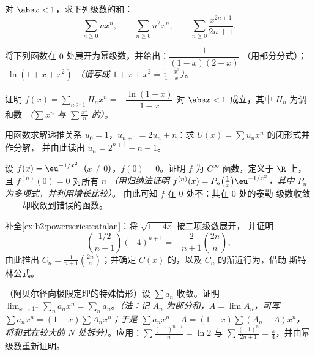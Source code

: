 \begin{exercise}[$\star$]\label{exo:b2:powerseries:3}
对 $\abs x < 1$，求下列级数的和：
\[
\sum_{n\geq0} n x^n,
\qquad
\sum_{n\geq0} n^2 x^n,
\qquad
\sum_{n\geq0} \frac{x^{2n+1}}{2n+1} .
\]
\end{exercise}

\begin{exercise}[$\star\star$]\label{exo:b2:powerseries:4}
将下列函数在 $0$ 处展开为幂级数，并给出：$\dfrac{1}{(1-x)(2-x)}$
（用部分分式）；$\;\ln(1 + x + x^2)$ \emph{（请写成 $1 + x + x^2
= \frac{1 - x^3}{1 - x}$）}。
\end{exercise}

\begin{exercise}[$\star\star$]\label{exo:b2:powerseries:5}
证明 $f(x) = \sum_{n\geq1} H_n x^n = -\dfrac{\ln(1 -
x)}{1 - x}$ 对 $\abs x < 1$ 成立，其中 $H_n$ 为调和数
\emph{（$\sum x^n$ 与 $\sum \frac{x^n}{n}$ 的）}。
\end{exercise}

\begin{exercise}[$\star\star$]\label{exo:b2:powerseries:6}
用函数求解递推关系 $u_0 = 1$，$u_{n+1} =
2u_n + n$：求 $U(x) = \sum u_nx^n$ 的闭形式并作分解，
并由此读出 $u_n = 2^{n+1} - n - 1$。
\end{exercise}

\begin{exercise}[$\star\star$]\label{exo:b2:powerseries:7}
设 $f(x) = \eu^{-1/x^2}$（$x \neq 0$），$f(0) = 0$。证明
$f$ 为 $C^\infty$ 函数，定义于 $\R$ 上，且 $f^{(n)}(0) = 0$ 对所有 $n$
\emph{（用归纳法证明 $f^{(n)}(x) = P_n\bigl(\frac1x\bigr)
\eu^{-1/x^2}$，其中 $P_n$ 为多项式，并利用增长比较）}。
由此可知 $f$ 在 $0$ 处不：其在 $0$ 处的泰勒
级数收敛——却收敛到错误的函数。
\end{exercise}

\begin{exercise}[$\star\star\star$]\label{exo:b2:powerseries:8}
补全\cref{ex:b2:powerseries:catalan}：将 $\sqrt{1 - 4x}$ 按二项级数展开，
并证明
\[
\binom{1/2}{n+1}(-4)^{n+1} = -\frac{2}{n+1}\binom{2n}{n},
\]
由此推出 $C_n = \frac{1}{n+1}\binom{2n}{n}$；并确定
$C(x)$ 的，以及 $C_n$ 的渐近行为，借助
斯特林公式。
\end{exercise}

\begin{exercise}[$\star\star\star$]\label{exo:b2:powerseries:9}
（阿贝尔径向极限定理的特殊情形）设 $\sum a_n$
收敛。证明 $\lim_{x \to 1^-} \sum_{n} a_n x^n = \sum_n
a_n$。\emph{（法：记 $A_n$ 为部分和，$A =
\lim A_n$，可写 $\sum a_nx^n = (1 - x)\sum A_n x^n$；于是 $\sum
a_nx^n - A = (1-x)\sum (A_n - A)x^n$，将和式在较大的
$N$ 处拆分）}。应用：$\sum \frac{(-1)^{n-1}}{n} = \ln 2$ 与 $\sum
\frac{(-1)^n}{2n+1} = \frac\pi4$，并由幂级数重新证明。
\end{exercise}

